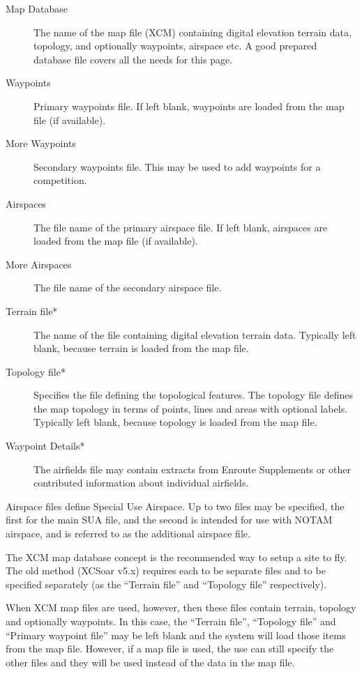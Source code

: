 \documentclass[a4paper,12pt]{refrep}
\begin{document}
\begin{description}
\item[Map Database]  The name of the map file (XCM) containing digital elevation
  terrain data, topology, and optionally waypoints, airspace etc. A good
  prepared database file covers all the needs for this page.
\item[Waypoints]  Primary waypoints file.  If left blank, waypoints are loaded
from the map file (if available).
\item[More Waypoints]  Secondary waypoints file.  This may be used to add waypoints for a competition.
\item[Airspaces]  The file name of the primary airspace file.  If left blank,
airspaces are loaded from the map file (if available).
\item[More Airspaces]  The file name of the secondary airspace file.
\item[Terrain file*]  The name of the file containing digital elevation
  terrain data.  Typically left blank, because terrain is loaded from the map
  file.
\item[Topology file*]  Specifies the file defining the topological features.
The topology file defines the map topology in terms of points, lines
and areas with optional labels.  Typically left blank, because topology is
loaded from the map file.
\item[Waypoint Details*]  The airfields file may contain extracts from Enroute Supplements or
other contributed information about individual airfields.
\end{description}

Airspace files define Special Use Airspace.  Up to two files may be
specified, the first for the main SUA file, and the second is intended
for use with NOTAM airspace, and is referred to as the additional
airspace file.

The XCM map database concept is the recommended way to setup a site to fly.
The old method (XCSoar v5.x) requires each to be separate files and to be
specified separately (as the ``Terrain file'' and ``Topology file'' respectively).  

When XCM map files are used, however, then these files contain terrain, topology
and optionally waypoints.  In this case, the ``Terrain file'', ``Topology file'' and 
``Primary waypoint file'' may be left blank and the system will load those items
from the map file. However, if a map file is used, the use can still specify the other
files and they will be used instead of the data in the map file.
\end{document}
